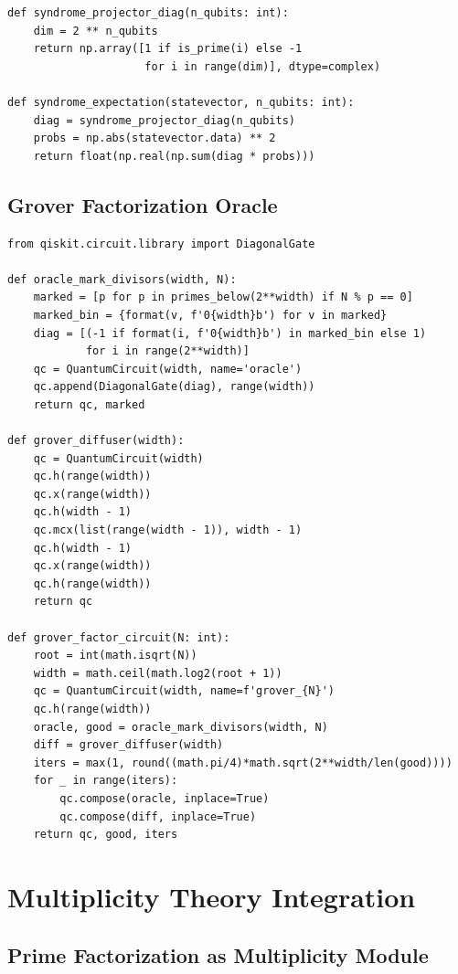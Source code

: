 \documentclass[11pt,letterpaper]{article}
\begin{document}
\begin{lstlisting}
def syndrome_projector_diag(n_qubits: int):
    dim = 2 ** n_qubits
    return np.array([1 if is_prime(i) else -1 
                     for i in range(dim)], dtype=complex)

def syndrome_expectation(statevector, n_qubits: int):
    diag = syndrome_projector_diag(n_qubits)
    probs = np.abs(statevector.data) ** 2
    return float(np.real(np.sum(diag * probs)))
\end{lstlisting}

\subsection{Grover Factorization Oracle}

\begin{lstlisting}
from qiskit.circuit.library import DiagonalGate

def oracle_mark_divisors(width, N):
    marked = [p for p in primes_below(2**width) if N % p == 0]
    marked_bin = {format(v, f'0{width}b') for v in marked}
    diag = [(-1 if format(i, f'0{width}b') in marked_bin else 1) 
            for i in range(2**width)]
    qc = QuantumCircuit(width, name='oracle')
    qc.append(DiagonalGate(diag), range(width))
    return qc, marked

def grover_diffuser(width):
    qc = QuantumCircuit(width)
    qc.h(range(width))
    qc.x(range(width))
    qc.h(width - 1)
    qc.mcx(list(range(width - 1)), width - 1)
    qc.h(width - 1)
    qc.x(range(width))
    qc.h(range(width))
    return qc

def grover_factor_circuit(N: int):
    root = int(math.isqrt(N))
    width = math.ceil(math.log2(root + 1))
    qc = QuantumCircuit(width, name=f'grover_{N}')
    qc.h(range(width))
    oracle, good = oracle_mark_divisors(width, N)
    diff = grover_diffuser(width)
    iters = max(1, round((math.pi/4)*math.sqrt(2**width/len(good))))
    for _ in range(iters):
        qc.compose(oracle, inplace=True)
        qc.compose(diff, inplace=True)
    return qc, good, iters
\end{lstlisting}

\section{Multiplicity Theory Integration}

\subsection{Prime Factorization as Multiplicity Module}
\end{document}
